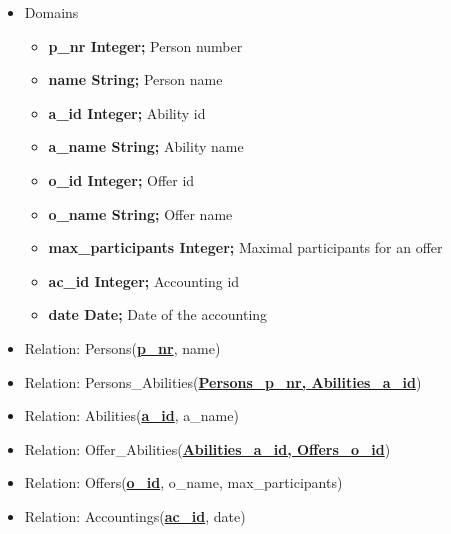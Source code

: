 \documentclass[12pt,a4paper,ngerman]{article}
\begin{document}
\begin{itemize}
	\item Domains
		\begin{itemize}
			\item \textbf{p\_nr Integer;} Person number
			\item \textbf{name String;} Person name
			\item \textbf{a\_id Integer;} Ability id
			\item \textbf{a\_name String;} Ability name
			\item \textbf{o\_id Integer;} Offer id
			\item \textbf{o\_name String;} Offer name
			\item \textbf{max\_participants Integer;} Maximal participants for an offer
			\item \textbf{ac\_id Integer;} Accounting id
			\item \textbf{date Date;} Date of the accounting
		\end{itemize}
	\item Relation: Persons(\textbf{\underline{p\_nr}}, name)
	\item Relation: Persons\_Abilities(\textbf{\underline{Persons\_p\_nr, Abilities\_a\_id}})
	\item Relation: Abilities(\textbf{\underline{a\_id}}, a\_name)
	\item Relation: Offer\_Abilities(\textbf{\underline{Abilities\_a\_id, Offers\_o\_id}})
	\item Relation: Offers(\textbf{\underline{o\_id}}, o\_name, max\_participants)
	\item Relation: Accountings(\textbf{\underline{ac\_id}}, date)
\end{itemize}
\end{document}

